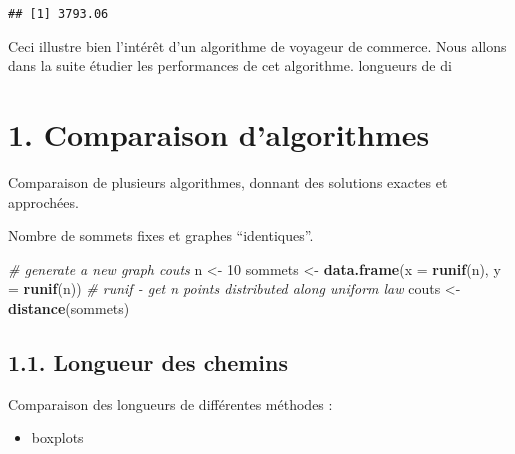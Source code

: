 \documentclass[
]{article}
\newenvironment{Shaded}{\begin{snugshade}}{\end{snugshade}}
\newcommand{\CommentTok}[1]{\textcolor[rgb]{0.56,0.35,0.01}{\textit{#1}}}
\newcommand{\DataTypeTok}[1]{\textcolor[rgb]{0.13,0.29,0.53}{#1}}
\newcommand{\DecValTok}[1]{\textcolor[rgb]{0.00,0.00,0.81}{#1}}
\newcommand{\KeywordTok}[1]{\textcolor[rgb]{0.13,0.29,0.53}{\textbf{#1}}}
\newcommand{\NormalTok}[1]{#1}
\newcommand{\StringTok}[1]{\textcolor[rgb]{0.31,0.60,0.02}{#1}}
\providecommand{\tightlist}{%
  \setlength{\itemsep}{0pt}\setlength{\parskip}{0pt}}
\begin{document}
\begin{verbatim}
## [1] 3793.06
\end{verbatim}

Ceci illustre bien l'intérêt d'un algorithme de voyageur de commerce.
Nous allons dans la suite étudier les performances de cet algorithme.
longueurs de di

\hypertarget{comparaison-dalgorithmes}{%
\section{1. Comparaison d'algorithmes}\label{comparaison-dalgorithmes}}

Comparaison de plusieurs algorithmes, donnant des solutions exactes et
approchées.

Nombre de sommets fixes et graphes ``identiques''.

\begin{Shaded}
\begin{Highlighting}[]
\CommentTok{# generate a new graph couts}
\NormalTok{      n <-}\StringTok{ }\DecValTok{10}
\NormalTok{sommets <-}\StringTok{ }\KeywordTok{data.frame}\NormalTok{(}\DataTypeTok{x =} \KeywordTok{runif}\NormalTok{(n), }\DataTypeTok{y =} \KeywordTok{runif}\NormalTok{(n)) }\CommentTok{# runif - get n points distributed along uniform law}
\NormalTok{  couts <-}\StringTok{ }\KeywordTok{distance}\NormalTok{(sommets)}
\end{Highlighting}
\end{Shaded}

\hypertarget{longueur-des-chemins}{%
\subsection{1.1. Longueur des chemins}\label{longueur-des-chemins}}

Comparaison des longueurs de différentes méthodes :

\begin{itemize}
\tightlist
\item
  boxplots
\end{itemize}
\end{document}
